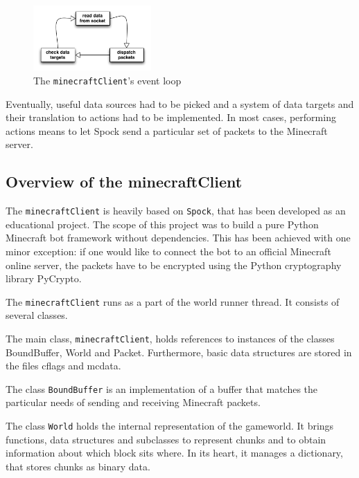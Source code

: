 
\begin{figure}
  \begin{center}
    \includegraphics[width=0.4\textwidth]{graphics/spock_eventloop}
  \end{center}
  \caption{The \texttt{minecraftClient}'s event loop}
  \label{spock_loop}
\end{figure}

Eventually, useful data sources had to be picked and a system of data targets and their translation to actions had to be implemented. In most cases, performing actions means to let Spock send a particular set of packets to the Minecraft server.

        \subsection{Overview of the minecraftClient}
The \texttt{minecraftClient} is heavily based on \texttt{Spock}, that has been developed as an educational project. The scope of this project was to build a pure Python Minecraft bot framework without dependencies. This has been achieved with one minor exception: if one would like to connect the bot to an official Minecraft online server, the packets have to be encrypted using the Python cryptography library PyCrypto.

The \texttt{minecraftClient} runs as a part of the world runner thread. It consists of several classes. 

The main class, \texttt{minecraftClient}, holds references to instances of the classes BoundBuffer,  World and Packet. Furthermore, basic data structures are stored in the files cflags and mcdata.

The class \texttt{BoundBuffer} is an implementation of a buffer that matches the particular needs of sending and receiving Minecraft packets.

The class \texttt{World} holds the internal representation of the gameworld. It brings functions, data structures and subclasses to represent chunks and to obtain information about which block sits where. In its heart, it manages a dictionary, that stores chunks as binary data.


